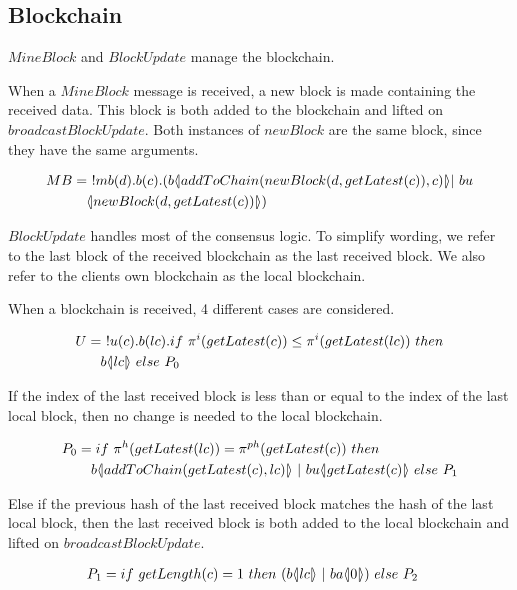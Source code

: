 \subsection{Blockchain}

$MineBlock$ and $BlockUpdate$ manage the blockchain.

When a $MineBlock$ message is received, a new block is made containing the received data.
This block is both added to the blockchain and lifted on $broadcastBlockUpdate$.
Both instances of $newBlock$ are the same block, since they have the same arguments.

\begin{align*}
    MB &=\ !mb(d).b(c).(b  \langle \! | addToChain(newBlock(d,getLatest(c)),c) | \! \rangle| \ bu\\
    &\quad  \langle \! | newBlock(d, getLatest(c)) | \! \rangle)
\end{align*}

$BlockUpdate$ handles most of the consensus logic.
To simplify wording, we refer to the last block of the received blockchain as the last received block.
We also refer to the clients own blockchain as the local blockchain.

When a blockchain is received, 4 different cases are considered.

\begin{align*}
	U &=\ !u(c).b(lc).if\ \pi^{i}( getLatest(c)) \leq \pi^{i}(getLatest(lc))\ then\\
	&\quad b \langle \! | lc | \! \rangle\ else\ P_0
\end{align*}

If the index of the last received block is less than or equal to the index of the last local block, then no change is needed to the local blockchain.

\begin{align*}
	P_0 &= if\ \pi^{h}(getLatest(lc))=\pi^{ph}(getLatest(c))\ then\\
	&\quad b\lift{}{addToChain(getLatest(c),lc)}\ | \ bu\lift{}{getLatest(c)}\ else\ P_1
\end{align*}

Else if the previous hash of the last received block matches the hash of the last local block, then the last received block is both added to the local blockchain and lifted on $broadcastBlockUpdate$.

\begin{align*}
	P_1 &= if\ getLength(c)=1\ then\ (b \langle \! | lc | \! \rangle\ |\ ba  \langle \! | 0 | \! \rangle)\ else\ P_2
\end{align*}

